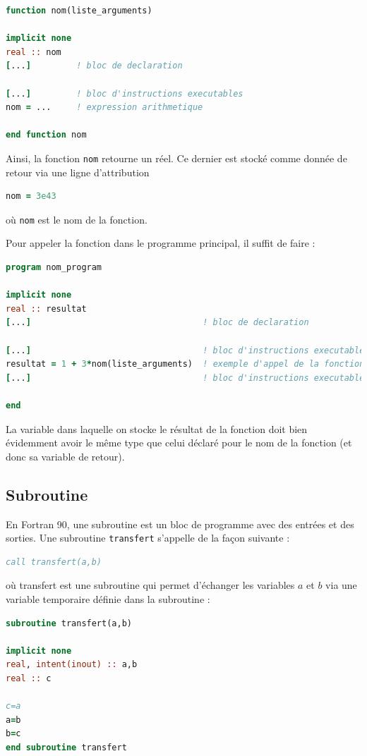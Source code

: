 \documentclass[a4paper,twoside]{article}
\begin{document}
\begin{lstlisting}[language=Fortran]
function nom(liste_arguments)

implicit none 
real :: nom 
[...]         ! bloc de declaration
 
[...]         ! bloc d'instructions executables
nom = ...     ! expression arithmetique

end function nom 
\end{lstlisting}

Ainsi, la fonction \texttt{nom} retourne un réel. Ce dernier est stocké comme donnée de retour via une ligne d'attribution
\begin{lstlisting}[language=Fortran]
nom = 3e43
\end{lstlisting}
où \texttt{nom} est le nom de la fonction.

Pour appeler la fonction dans le programme principal, il suffit de faire :
\begin{lstlisting}[language=Fortran]
program nom_program 

implicit none 
real :: resultat
[...]                                  ! bloc de declaration 

[...]                                  ! bloc d'instructions executables 
resultat = 1 + 3*nom(liste_arguments)  ! exemple d'appel de la fonction nom 
[...]                                  ! bloc d'instructions executables 

end 
\end{lstlisting}

\begin{remarque}
La variable dans laquelle on stocke le résultat de la fonction doit bien évidemment avoir le même type que celui déclaré pour le nom de la fonction (et donc sa variable de retour).
\end{remarque}

\subsection{Subroutine}
En Fortran 90, une subroutine est un bloc de programme avec des entrées et des sorties. Une subroutine \texttt{transfert} s'appelle de la façon suivante : 
\begin{lstlisting}[language=Fortran]
call transfert(a,b)
\end{lstlisting}

où transfert est une subroutine qui permet d'échanger les variables $a$ et $b$ via une variable temporaire définie dans la subroutine : 
\begin{lstlisting}[language=Fortran]
subroutine transfert(a,b)

implicit none
real, intent(inout) :: a,b
real :: c

c=a
a=b
b=c
end subroutine transfert
\end{lstlisting}
\end{document}

